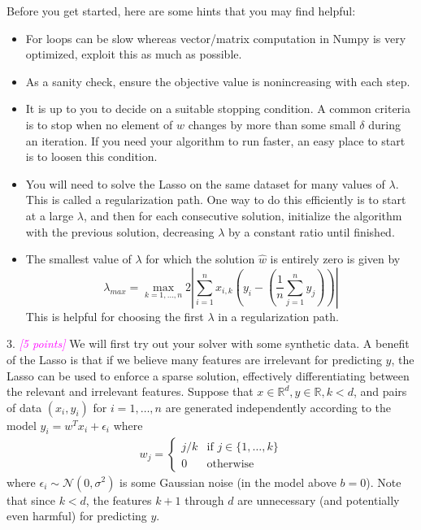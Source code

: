 \documentclass{article}
\newcommand{\1}{\mathbf{1}}
\newcommand{\grade}[1]{\small\textcolor{magenta}{\emph{[#1 points]}} \normalsize}
\begin{document}
Before you get started, here are some hints that you may find helpful:
\begin{itemize}
  \item For loops can be slow whereas vector/matrix computation in Numpy is very optimized, exploit this as much as possible.
  \item As a sanity check, ensure the objective value is nonincreasing with each step. 
  \item It is up to you to decide on a suitable stopping condition.  A common criteria is to stop when no element of
      ${w}$ changes by more than some small $\delta$ during an iteration.  If you need your algorithm to run faster,
      an easy place to start is to loosen this condition.
  \item You will need to solve the Lasso on the same dataset for many values of $\lambda$.  This
      is called a regularization path.  One way to do this efficiently is to start at a large $\lambda$, and then for
      each consecutive solution, initialize the algorithm with the previous solution, decreasing $\lambda$ by a constant
      ratio until finished.
  \item The smallest value of $\lambda$ for which the solution $\widehat{w}$ is entirely zero is given by
      \[ \lambda_{max} = \max_{k=1,\dots,n} 2 \left|\sum_{i=1}^n {x}_{i,k} \left({y}_i - \left(\frac{1}{n} \sum_{j=1}^n y_j \right)\right)\right| \]
      This is helpful for choosing the first $\lambda$ in a regularization path. 
\end{itemize}


3. \grade{5}  We will first try out your solver with some synthetic data.
A benefit of the Lasso is that if we believe many features are irrelevant for predicting ${y}$, the Lasso can be used to enforce a sparse solution, effectively differentiating between the relevant and irrelevant features.
Suppose that ${x} \in \mathbb{R}^d, y \in \mathbb{R}, k < d$, and pairs of data $({x}_i, y_i)$ for $i=1,\dots,n$ are generated independently according to the model $y_i = w^T x_i + \epsilon_i$ where
\begin{align*}
w_j = \begin{cases} j/k & \text{if } j \in \{1,\dots,k\} \\
0 & \text{otherwise}
\end{cases}
\end{align*} 
where $\epsilon_i \sim \mathcal{N}(0, \sigma^2)$ is some Gaussian noise (in the model above $b=0$).  Note that since $k < d$, the features $k + 1$ through $d$ are unnecessary (and potentially even harmful) for predicting $y$.
\end{document}
